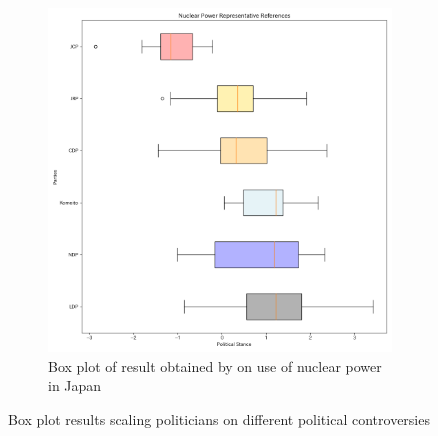 \documentclass[final,5p,times,twocolumn,authoryear]{elsarticle}
\begin{document}
\begin{figure}
    \begin{subfigure}{0.3\textwidth}
      \centering
      \includegraphics[width=1\linewidth]{figs/nuclear_box_plot.png}
      \caption{Box plot of result obtained by \citeauthor{kato2024lupinllmbasedpoliticalideology} on use of nuclear power in Japan}
      \label{fig:sub2}
    \end{subfigure}
\caption{Box plot results scaling politicians on different political controversies\citep{kato2024lupinllmbasedpoliticalideology}}
\label{fig: Previous box plots}
\end{figure}
\end{document}
